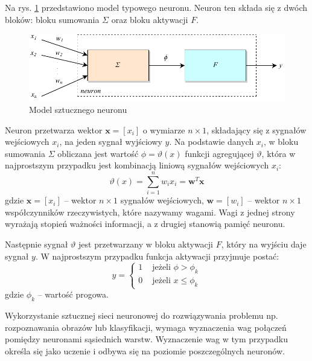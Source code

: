 Na rys. \ref{fig:ssn-neuron} przedstawiono model typowego neuronu. Neuron ten składa się z dwóch bloków: bloku sumowania $\Sigma$ oraz bloku aktywacji $F$.

\begin{figure}[h]
	\centering
	\includegraphics[scale=1.0]{graphics/01_podstawy_teoretyczne/ssn-neuron.pdf}
	\caption{ Model sztucznego neuronu }
	\label{fig:ssn-neuron}
\end{figure}

Neuron przetwarza wektor $\boldsymbol{x} = [x_i]$ o wymiarze $n \times 1$, składający się z sygnałów wejściowych $x_i$, na jeden sygnał wyjściowy $y$. Na podstawie danych $x_i$, w bloku sumowania $\Sigma$ obliczana jest wartość $\phi = \vartheta(x)$ funkcji agregującej $\vartheta$, która w najprostszym przypadku jest kombinacją liniową sygnałów wejściowych $x_i$:
\begin{equation} 
\label{ssn_vartheta} 
\vartheta(x) = \sum\limits_{i = 1}^n w_ix_i = \boldsymbol{w}^T\boldsymbol{x}
\end{equation} gdzie $\boldsymbol{x} = [x_i]$ -- wektor $n \times 1$ sygnałów wejściowych, $\boldsymbol{w} = [w_i]$ -- wektor $n \times 1$ współczynników rzeczywistych, które nazywamy wagami. Wagi z jednej strony wyrażają stopień ważności informacji, a z drugiej stanowią pamięć neuronu.

Następnie sygnał $\vartheta$ jest przetwarzany w bloku aktywacji $F$, który na wyjściu daje sygnał $y$. W najprostszym przypadku funkcja aktywacji przyjmuje postać:
\begin{equation} 
\label{ssn_y} 
y = \begin{cases}
		1 & \text{ jeżeli } \phi > \phi_k \\
		0 & \text{ jeżeli } x \leq \phi_k
	\end{cases} 
\end{equation} gdzie $\phi_k$ -- wartość progowa.

Wykorzystanie sztucznej sieci neuronowej do rozwiązywania problemu np. rozpoznawania obrazów lub klasyfikacji, wymaga wyznaczenia wag połączeń pomiędzy neuronami sąsiednich warstw. Wyznaczenie wag w tym przypadku określa się jako uczenie i odbywa się na poziomie poszczególnych neuronów.

